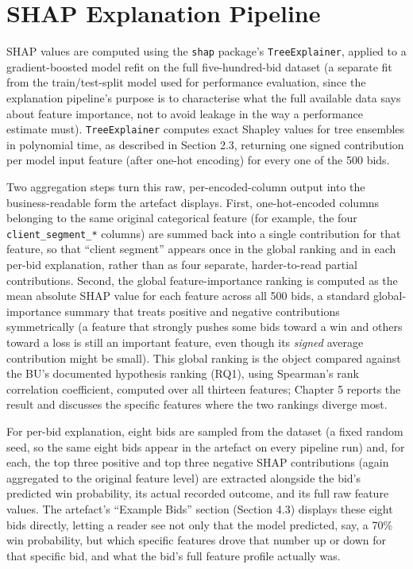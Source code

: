 \hypertarget{shap-explanation-pipeline}{%
\section{SHAP Explanation Pipeline}\label{shap-explanation-pipeline}}

SHAP values are computed using the \texttt{shap} package's
\texttt{TreeExplainer}, applied to a gradient-boosted model refit on the
full five-hundred-bid dataset (a separate fit from the train/test-split
model used for performance evaluation, since the explanation pipeline's
purpose is to characterise what the full available data says about
feature importance, not to avoid leakage in the way a performance
estimate must). \texttt{TreeExplainer} computes exact Shapley values for
tree ensembles in polynomial time, as described in Section 2.3,
returning one signed contribution per model input feature (after one-hot
encoding) for every one of the 500 bids.

Two aggregation steps turn this raw, per-encoded-column output into the
business-readable form the artefact displays. First, one-hot-encoded
columns belonging to the same original categorical feature (for example,
the four \texttt{client\_segment\_*} columns) are summed back into a
single contribution for that feature, so that ``client segment'' appears
once in the global ranking and in each per-bid explanation, rather than
as four separate, harder-to-read partial contributions. Second, the
global feature-importance ranking is computed as the mean absolute SHAP
value for each feature across all 500 bids, a standard global-importance
summary that treats positive and negative contributions symmetrically (a
feature that strongly pushes some bids toward a win and others toward a
loss is still an important feature, even though its \emph{signed}
average contribution might be small). This global ranking is the object
compared against the BU's documented hypothesis ranking (RQ1), using
Spearman's rank correlation coefficient, computed over all thirteen
features; Chapter 5 reports the result and discusses the specific
features where the two rankings diverge most.

For per-bid explanation, eight bids are sampled from the dataset (a
fixed random seed, so the same eight bids appear in the artefact on
every pipeline run) and, for each, the top three positive and top three
negative SHAP contributions (again aggregated to the original feature
level) are extracted alongside the bid's predicted win probability, its
actual recorded outcome, and its full raw feature values. The artefact's
``Example Bids'' section (Section 4.3) displays these eight bids
directly, letting a reader see not only that the model predicted, say, a
70\% win probability, but which specific features drove that number up
or down for that specific bid, and what the bid's full feature profile
actually was.

